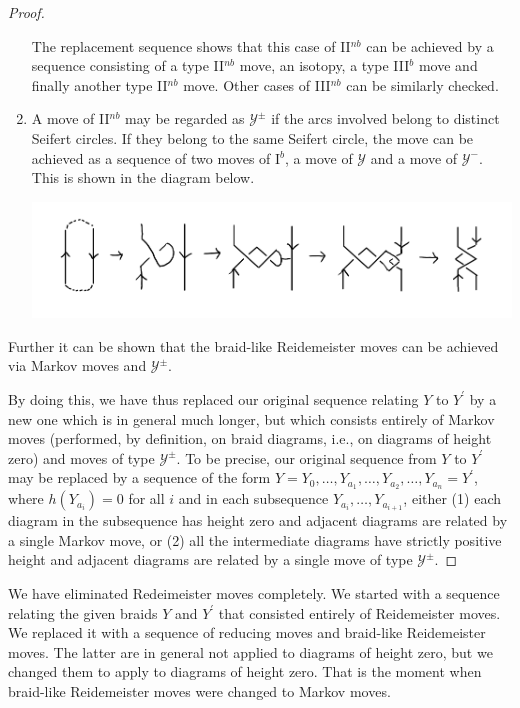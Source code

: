 \begin{proof}
\begin{enumerate}
The replacement sequence shows that this case of II$^{nb}$ can be achieved
by a sequence consisting of a type II$^{nb}$ move, an isotopy, a type III$^b$ move and finally another type II$^{nb}$ move. Other cases of III$^{nb}$ can be similarly checked.
\item\label{item:15} A move of II$^{nb}$ may be regarded as $\mathcal{Y}^{\pm}$ if the arcs involved belong to distinct Seifert circles. If they belong to the same Seifert circle, the move can be achieved as a sequence of two moves of I$^b$, a move of $\mathcal{Y}$ and a move of $\mathcal{Y}^{-}$. This is shown in the diagram below.
\begin{center}
 \includegraphics[scale=.25]{images/6.png}
\end{center}
\end{enumerate}
Further it can be shown that the braid-like Reidemeister moves can be achieved via Markov moves and $\mathcal{Y}^{\pm}$.

By doing this, we have thus replaced our original sequence relating $Y$ to $Y^{\prime}$ by a new one which is in general much longer, but which consists entirely of Markov moves (performed, by definition, on braid diagrams, i.e., on diagrams of height zero) and moves of type $\mathcal{Y}^{\pm}$. To be precise, our original sequence from $Y$ to $Y^{\prime}$ may be replaced by a sequence of the form $Y = Y_0,\ldots, Y_{a_1},\ldots, Y_{a_2},\ldots, Y_{a_n} = Y^{\prime}$, where $h(Y_{a_i}) = 0$ for all $i$ and in each subsequence $Y_{a_i},\ldots,Y_{a_{i+1}}$, either (1) each diagram in the subsequence has height zero and adjacent diagrams are related by a single Markov move, or (2) all the intermediate diagrams have strictly positive height and adjacent diagrams are related by a single move of type $\mathcal{Y}^{\pm}$.
\end{proof}

We have eliminated Redeimeister moves completely. We started with a sequence relating the given braids $Y$ and $Y^{\prime}$ that consisted entirely of Reidemeister moves. We replaced it with a sequence of reducing moves and braid-like Reidemeister moves. The latter are in general not applied to
diagrams of height zero, but we changed them to apply to diagrams of height zero. That is the moment when braid-like Reidemeister moves were changed to Markov moves.

